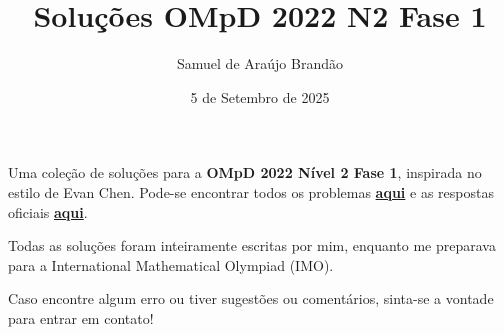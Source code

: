 \documentclass[12pt]{article}
\title{\sffamily\bfseries{Soluções OMpD 2022 N2 Fase 1}}
\author{Samuel de Araújo Brandão}
\date{5 de Setembro de 2025}
\begin{document}
  \maketitle
  Uma coleção de soluções para a \textbf{OMpD 2022 Nível 2 Fase 1}, inspirada no estilo de Evan Chen.
  Pode-se encontrar todos os problemas \textbf{\href{https://drive.google.com/file/d/1hwuCdi4SfUY-Gf1hCqBaIu7lwpr1JyxA/view}
  {aqui}} e as respostas oficiais \textbf{\href{https://drive.google.com/file/d/1epNXf5htopJSNVTkVXZBUBZU6akjIYoy/view}{aqui}}.

  Todas as soluções foram inteiramente escritas por mim, enquanto me preparava para a
  International Mathematical Olympiad (IMO).

  Caso encontre algum erro ou tiver sugestões ou comentários, sinta-se a vontade 
  para entrar em contato!

  \tableofcontents

  \clearpage
\end{document}
